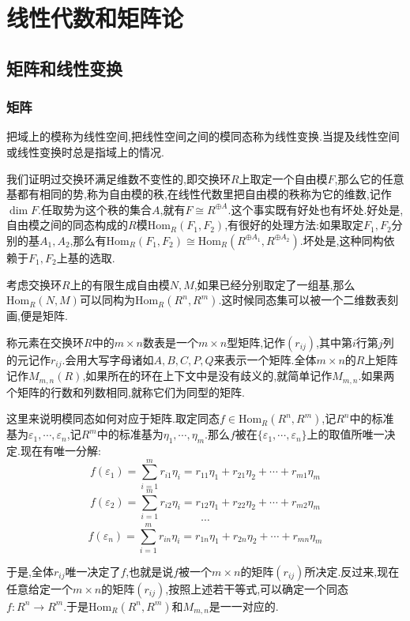 \chapter{线性代数和矩阵论}
\section{矩阵和线性变换}
\subsection{矩阵}

把域上的模称为线性空间,把线性空间之间的模同态称为线性变换.当提及线性空间或线性变换时总是指域上的情况.

我们证明过交换环满足维数不变性的,即交换环$R$上取定一个自由模$F$,那么它的任意基都有相同的势,称为自由模的秩,在线性代数里把自由模的秩称为它的维数,记作$\dim F$.任取势为这个秩的集合$A$,就有$F\cong R^{\oplus A}$.这个事实既有好处也有坏处.好处是,自由模之间的同态构成的$R$模$\mathrm{Hom}_R(F_1,F_2)$,有很好的处理方法:如果取定$F_1,F_2$分别的基$A_1,A_2$,那么有$\mathrm{Hom}_R(F_1,F_2)\cong\mathrm{Hom}_R(R^{\oplus A_1},R^{\oplus A_2})$.坏处是,这种同构依赖于$F_1,F_2$上基的选取.

考虑交换环$R$上的有限生成自由模$N,M$,如果已经分别取定了一组基,那么$\mathrm{Hom}_R(N,M)$可以同构为$\mathrm{Hom}_R(R^n,R^m)$.这时候同态集可以被一个二维数表刻画,便是矩阵.

称元素在交换环$R$中的$m\times n$数表是一个$m\times n$型矩阵,记作$(r_ {ij})$,其中第$i$行第$j$列的元记作$r_{ij}$.会用大写字母诸如$A,B,C,P,Q$来表示一个矩阵.全体$m\times n$的$R$上矩阵记作$M_{m,n}(R)$,如果所在的环在上下文中是没有歧义的,就简单记作$M_{m,n}$.如果两个矩阵的行数和列数相同,就称它们为同型的矩阵.

这里来说明模同态如何对应于矩阵.取定同态$f\in\mathrm{Hom}_R(R^n,R^m)$,记$R^n$中的标准基为$\varepsilon_1,\cdots,\varepsilon_n$,记$R^m$中的标准基为$\eta_1,\cdots,\eta_m$.那么$f$被在$\{\varepsilon_1,\cdots,\varepsilon_n\}$上的取值所唯一决定.现在有唯一分解:
$$f(\varepsilon_1)=\sum_{i=1}^mr_{i1}\eta_i=r_{11}\eta_1+r_{21}\eta_2+\cdots+r_{m1}\eta_m$$
$$f(\varepsilon_2)=\sum_{i=1}^mr_{i2}\eta_i=r_{12}\eta_1+r_{22}\eta_2+\cdots+r_{m2}\eta_m$$
$$\cdots$$
$$f(\varepsilon_n)=\sum_{i=1}^mr_{in}\eta_i=r_{1n}\eta_1+r_{2n}\eta_2+\cdots+r_{mn}\eta_m$$

于是,全体$r_{ij}$唯一决定了$f$,也就是说$f$被一个$m\times n$的矩阵$(r_{ij})$所决定.反过来,现在任意给定一个$m\times n$的矩阵$(r_{ij})$,按照上述若干等式,可以确定一个同态$f:R^n\to R^m$.于是$\mathrm{Hom}_R(R^n,R^m)$和$M_{m,n}$是一一对应的.

